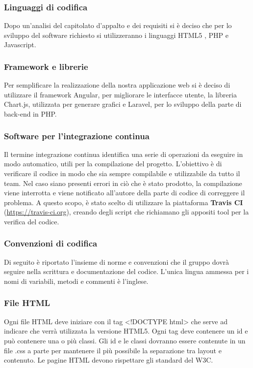 \subsubsection{Linguaggi di codifica}
Dopo un'analisi del capitolato d'appalto e dei requisiti si è deciso che per lo sviluppo del software richiesto si utilizzeranno i linguaggi \gls{HTML5} , \gls{PHP} e \gls{Javascript}.

\subsubsection{Framework e librerie}
Per semplificare la realizzazione della nostra applicazione web si è deciso di utilizzare il \gls{framework} \gls{Angular}, per migliorare le interfacce utente, la libreria \gls{Chart.js}, utilizzata per generare grafici e \gls{Laravel}, per lo sviluppo della parte di back-end in \gls{PHP}.

\subsubsection{Software per l’integrazione continua}
Il termine \gls{integrazione continua} identifica una serie di operazioni da eseguire in modo automatico, utili per la compilazione del progetto. L'obiettivo è di verificare il codice in modo che sia sempre compilabile e utilizzabile da tutto il team. Nel caso siano presenti errori in ciò che è stato prodotto, la compilazione viene interrotta e viene notificato all'autore della parte di codice di correggere il problema.
A questo scopo, è stato scelto di utilizzare la piattaforma \textbf{Travis CI} (\url{https://travis-ci.org}), creando degli script che richiamano gli appositi tool per la verifica del codice.

\subsubsection{Convenzioni di codifica}
Di seguito è riportato l'insieme di norme e convenzioni che il gruppo dovrà seguire nella scrittura e documentazione del codice.
L'unica lingua ammessa per i nomi di variabili, metodi e commenti è l'inglese.

\subsubsection{File HTML}

Ogni file \gls{HTML} deve iniziare con il tag <!DOCTYPE html> che serve ad indicare che verrà utilizzata la versione \gls{HTML5}.
Ogni tag deve contenere un id e può contenere una o più classi.
Gli id e le classi dovranno essere contenute in un file .css a parte per mantenere il più possibile la separazione tra \gls{layout} e contenuto.
Le pagine \gls{HTML} devono rispettare gli standard del \gls{W3C}.

